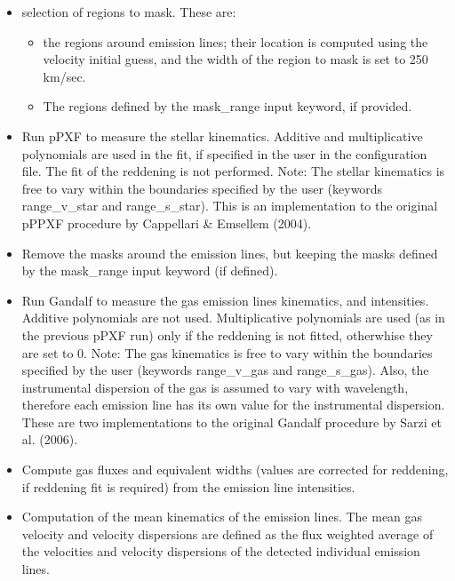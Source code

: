 \begin{itemize}

\item selection of regions to mask. These are:
   \begin{itemize} 

      \item the regions around emission lines; their location is
        computed using the velocity initial guess, and the width of
        the region to mask is set to 250 km/sec.

      \item The regions defined by the mask\_range input keyword, if
        provided.

   \end{itemize}

\item Run pPXF to measure the stellar kinematics. Additive and
  multiplicative polynomials are used in the fit, if specified in the
  user in the configuration file. The fit of the reddening is not
  performed. Note: The stellar kinematics is free to vary within the
  boundaries specified by the user (keywords range\_v\_star and
  range\_s\_star). This is an implementation to the original pPPXF
  procedure by Cappellari \& Emsellem (2004).

\item Remove the masks around the emission lines, but keeping the
  masks defined by the mask\_range input keyword (if defined).

\item Run Gandalf to measure the gas emission lines kinematics, and
  intensities. Additive polynomials are not used. Multiplicative
  polynomials are used (as in the previous pPXF run) only if the
  reddening is not fitted, otherwhise they are set to 0. Note: The gas
  kinematics is free to vary within the boundaries specified by the
  user (keywords range\_v\_gas and range\_s\_gas).  Also, the
  instrumental dispersion of the gas is assumed to vary with
  wavelength, therefore each emission line has its own value for the
  instrumental dispersion.  These are two implementations to the
  original Gandalf procedure by Sarzi et al. (2006).

\item Compute gas fluxes and equivalent widths (values are corrected
  for reddening, if reddening fit is required) from the emission line
  intensities.

\item Computation of the mean kinematics of the emission lines. The
  mean gas velocity and velocity dispersions are defined as the flux
  weighted average of the velocities and velocity dispersions of the
  detected individual emission lines.


\end{itemize}

